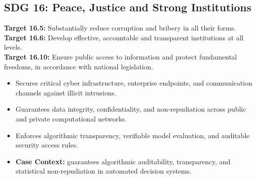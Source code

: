 \subsection{SDG 16: Peace, Justice and Strong Institutions}
\noindent\textbf{Target 16.5:} Substantially reduce corruption and bribery in all their forms. \\
\noindent\textbf{Target 16.6:} Develop effective, accountable and transparent institutions at all levels. \\
\noindent\textbf{Target 16.10:} Ensure public access to information and protect fundamental freedoms, in accordance with national legislation.
\begin{itemize}
  \item Secures critical cyber infrastructure, enterprise endpoints, and communication channels against illicit intrusions.
  \item Guarantees data integrity, confidentiality, and non-repudiation across public and private computational networks.
  \item Enforces algorithmic transparency, verifiable model evaluation, and auditable security access rules.
  \item \textbf{Case Context:} guarantees algorithmic auditability, transparency, and statistical non-repudiation in automated decision systems.
\end{itemize}
